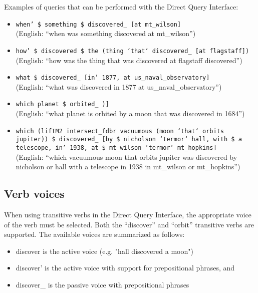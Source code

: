 \documentclass[../main.tex]{subfiles}
\begin{document}
Examples of queries that can be performed with the Direct Query Interface:
\begin{itemize}
	\item \texttt{when' \$ something \$ discovered\_ [at mt\_wilson]} \\(English: ``when was something discovered at mt\_wilson'')
	\item \texttt{how' \$ discovered \$
	\subitem the (thing `that` discovered\_ [at flagstaff])} \\(English: ``how was the thing that was discovered at flagstaff discovered'')
	\item \texttt{what \$ discovered\_ [in' 1877, at us\_naval\_observatory]} \\(English: ``what was discovered in 1877 at us\_naval\_observatory'')
	\item \texttt{which planet \$ orbited\_ 
		\subitem [by \$ a (moon `that` discovered\_ [in' 1684])]} \\(English: ``what planet is orbited by a moon that was discovered in 1684'')
	\item \texttt{which
		\subitem (liftM2 intersect\_fdbr vacuumous  (moon `that` orbits jupiter))
		\subitem \$ discovered\_ [by \$ nicholson `termor` hall, \subsubitem with \$ a telescope, in' 1938, \subsubitem at \$ mt\_wilson `termor` mt\_hopkins]}\\(English: ``which vacuumous moon that orbits jupiter was discovered by nicholson or hall with a telescope in 1938 in mt\_wilson or mt\_hopkins'')
\end{itemize}

\subsection{Verb voices}

When using transitive verbs in the Direct Query Interface, the appropriate voice of the verb must be selected.  Both the ``discover'' and ``orbit''
transitive verbs are supported.  The available voices are summarized as follows:

\begin{itemize}
	\item discover is the active voice (e.g. "hall discovered a moon")
	\item discover' is the active voice with support for prepositional phrases, and
	\item discover\_ is the passive voice with prepositional phrases
\end{itemize}
\end{document}
